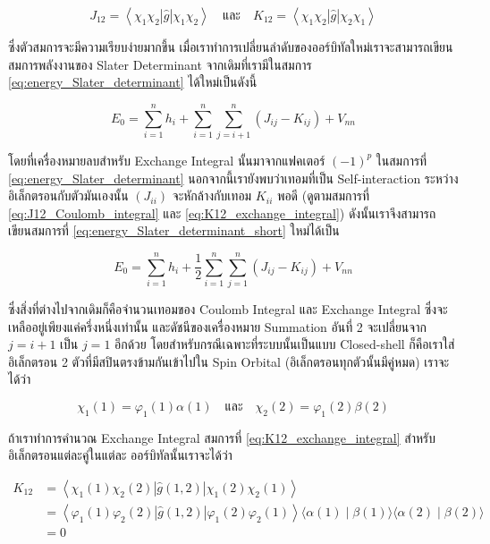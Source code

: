 \begin{equation}
    J_{12} = \left\langle\chi_1 \chi_2|\hat{g}| \chi_1 \chi_2\right\rangle
    \quad \text{และ} \quad
    K_{12} = \left\langle\chi_1 \chi_2|\hat{g}| \chi_2 \chi_1\right\rangle
\end{equation}

\noindent ซึ่งตัวสมการจะมีความเรียบง่ายมากขึ้น เมื่อเราทำการเปลี่ยนลำดับของออร์บิทัลใหม่เราจะสามารถเขียนสมการพลังงานของ Slater
Determinant จากเดิมที่เรามีในสมการ \eqref{eq:energy_Slater_determinant} ได้ใหม่เป็นดังนี้

\begin{equation}
    \label{eq:energy_Slater_determinant_short}
    E_0
    =
    \sum_{i=1}^n h_i
    + \sum_{i=1}^n \sum_{j=i+1}^n
    \left(J_{i j}-K_{i j}\right)
    + V_{n n}
\end{equation}

\noindent โดยที่เครื่องหมายลบสำหรับ Exchange Integral นั้นมาจากแฟคเตอร์ $(-1)^p$ ในสมการที่ \eqref{eq:energy_Slater_determinant}
นอกจากนี้เรายังพบว่าเทอมที่เป็น Self-interaction ระหว่างอิเล็กตรอนกับตัวมันเองนั้น $(J_{i i})$ จะหักล้างกับเทอม $K_{i i}$ พอดี
(ดูตามสมการที่ \eqref{eq:J12_Coulomb_integral} และ \eqref{eq:K12_exchange_integral}) ดังนั้นเราจึงสามารถเขียนสมการที่
\eqref{eq:energy_Slater_determinant_short} ใหม่ได้เป็น

\begin{equation}
    \label{eq:energy_Slater_determinant_reduced}
    E_0 = \sum_{i=1}^n h_i
    + \frac{1}{2} \sum_{i=1}^n \sum_{j=1}^n\left(J_{i j}-K_{i j}\right)
    + V_{n n}
\end{equation}

\noindent ซึ่งสิ่งที่ต่างไปจากเดิมก็คือจำนวนเทอมของ Coulomb Integral และ Exchange Integral ซึ่งจะเหลืออยู่เพียงแค่ครึ่งหนึ่งเท่านั้น%
และดัชนีของเครื่องหมาย Summation อันที่ 2 จะเปลี่ยนจาก $j = i+1$ เป็น $j = 1$ อีกด้วย โดยสำหรับกรณีเฉพาะที่ระบบนั้นเป็นแบบ
Closed-shell ก็คือเราใส่อิเล็กตรอน 2 ตัวที่มีสปินตรงข้ามกันเข้าไปใน Spin Orbital (อิเล็กตรอนทุกตัวนั้นมีคู่หมด) เราจะได้ว่า

\begin{equation}
    \chi_1(1) = \varphi_1(1) \alpha(1)
    \quad \text{และ} \quad
    \chi_2(2) = \varphi_1(2) \beta(2)
\end{equation}

\noindent ถ้าเราทำการคำนวณ Exchange Integral สมการที่ \eqref{eq:K12_exchange_integral} สำหรับอิเล็กตรอนแต่ละคู่ในแต่ละ%
ออร์บิทัลนั้นเราจะได้ว่า

\begin{equation}
    \begin{aligned}
        K_{12}
         & = \left\langle\chi_1(1) \chi_2(2)|\hat{g}(1,2)| \chi_1(2) \chi_2(1)\right\rangle \\
         & = \left\langle\varphi_1(1) \varphi_2(2)|\hat{g}(1,2)| \varphi_1(2)
        \varphi_2(1)\right\rangle\langle\alpha(1) \mid \beta(1)\rangle\langle\alpha(2)
        \mid \beta(2)\rangle                                                                \\
         & = 0
    \end{aligned}
\end{equation}

